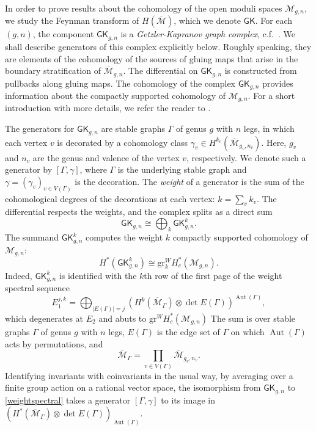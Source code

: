 \documentclass[12pt]{amsart}
\theoremstyle{definition}
\numberwithin{equation}{section}
\newcommand{\M}{\mathcal{M}}
\DeclareMathOperator{\Aut}{Aut}
\newcommand{\cM}{\mathcal{M}}
\newcommand{\Mb}{\overline{\M}}
\theoremstyle{definition} %
\theoremstyle{remark}
\newcommand{\gr}{\mathrm{gr}}
\newcommand{\GK}{\mathsf{GK}}
\begin{document}
In order to prove results about the cohomology of the open moduli spaces $\M_{g,n}$, we study the Feynman transform of $H(\Mb)$,
which we denote $\GK$.
For each $(g, n)$, the component $\GK_{g,n}$ is a \emph{Getzler-Kapranov graph complex}, c.f.\ \cite[Definition 2.2]{PayneWillwacher24b}. We shall describe generators of this complex explicitly below.
Roughly speaking, they are elements of the cohomology of the sources of gluing maps that arise in the boundary stratification of $\Mb_{g,n}$.
The differential on $\GK_{g,n}$ is constructed from pullbacks along gluing maps. The cohomology of the complex $\GK_{g,n}$ provides information about the compactly supported cohomology of $\M_{g,n}$.
For a short introduction with more details, we refer the reader to  \cite[Sections~2.3-2.5]{PayneWillwacher24b}.

The generators for $\mathsf{GK}_{g,n}$ are stable graphs $\Gamma$ of genus $g$ with $n$ legs, in which each vertex $v$ is decorated by a cohomology class $\gamma_v\in H^{k_v}(\Mb_{g_v,n_v})$. Here, $g_v$ and $n_v$ are the genus and valence of the vertex $v$, respectively. We denote such a generator by $[\Gamma,\gamma]$, where $\Gamma$ is the underlying stable graph and $\gamma=(\gamma_v)_{v\in V(\Gamma)}$ is the decoration. The \emph{weight} of a generator is the sum of the cohomological degrees of the decorations at each vertex: $k=\sum_v k_v$. The differential respects the weights, and the complex splits as a direct sum 
\[
\mathsf{GK}_{g,n} \cong \bigoplus_{k}\mathsf{GK}_{g,n}^k.
\]
The summand $\mathsf{GK}_{g,n}^k$ computes the weight $k$ compactly supported cohomology of $\M_{g,n}$:
\[
H^*(\mathsf{GK}_{g,n}^k)\cong \gr_k^W H^*_c(\M_{g,n}).
\]
Indeed, $\mathsf{GK}_{g,n}^k$ is identified with the $k$th row of the first page of the weight spectral sequence
\begin{equation}\label{weightspectral}
E_1^{j,k}=\bigoplus_{|E(\Gamma)|=j} (H^k(\Mb_{\Gamma})\otimes \det E(\Gamma))^{\Aut(\Gamma)},
\end{equation}
which degenerates at $E_2$ and abuts to $\gr^W H^{*}_c(\cM_{g,n})$ The sum is over stable graphs $\Gamma$ of genus $g$ with $n$ legs,  $E(\Gamma)$ is the edge set of $\Gamma$ on which $\Aut(\Gamma)$ acts by permutations, and 
\[
\Mb_{\Gamma}=\prod_{v\in V(\Gamma)} \Mb_{g_v,n_v}.
\]
Identifying invariants with coinvariants in the usual way, by averaging over a finite group action on a rational vector space, the isomorphism from $\GK_{g,n}$ to \eqref{weightspectral} takes a generator $[\Gamma, \gamma]$ to its image in $(H^*(\Mb_\Gamma) \otimes \det E(\Gamma))_{\Aut(\Gamma)}$. 
\end{document}
